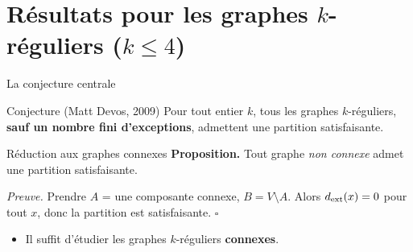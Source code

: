 \section{R\'esultats pour les graphes $k$-r\'eguliers ($k \leq 4$)}

\begin{frame}{La conjecture centrale}
  \begin{alertblock}{Conjecture (Matt Devos, 2009)}
    Pour tout entier $k$, tous les graphes $k$-r\'eguliers, \textbf{sauf un nombre fini d'exceptions}, admettent une partition satisfaisante.
  \end{alertblock}

  \bigskip

  \begin{block}{R\'eduction aux graphes connexes}
    \textbf{Proposition.} Tout graphe \emph{non connexe} admet une partition satisfaisante.

    \smallskip
    \textit{Preuve.} Prendre $A$ = une composante connexe, $B = V \setminus A$.
    Alors $d_{\mathrm{ext}}(x) = 0$ pour tout $x$, donc la partition est satisfaisante. \hfill$\square$
  \end{block}

  \bigskip
  \begin{itemize}
    \item[$\Rightarrow$] Il suffit d'\'etudier les graphes $k$-r\'eguliers \textbf{connexes}.
  \end{itemize}
\end{frame}

